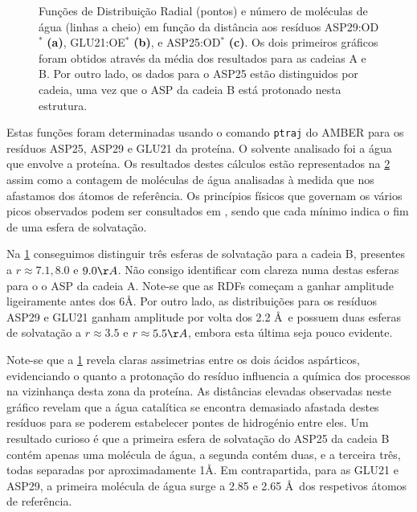 \documentclass[12pt,a4paper]{article}
\begin{document}
\begin{figure}[h]
\begin{subfigure}[b]{0.6\textwidth}
			\caption{}
			\label{fig:an:rdf-asp25}
		\end{subfigure}
		\caption{Funções de Distribuição Radial (pontos) e número de moléculas de água (linhas a cheio) em função da distância aos resíduos ASP29:OD$^{*}$ \textbf{(a)}, GLU21:OE$^{*}$ \textbf{(b)}, e ASP25:OD$^{*}$ \textbf{(c)}. Os dois primeiros gráficos foram obtidos através da média dos resultados para as cadeias A e B. Por outro lado, os dados para o ASP25 estão distinguidos por cadeia, uma vez que o ASP da cadeia B está protonado nesta estrutura.}
		\label{fig:an:rdf-all}
	\end{figure}

	Estas funções foram determinadas usando o comando \verb|ptraj| do AMBER para os resíduos ASP25, ASP29 e GLU21 da proteína. O solvente analisado foi a água que envolve a proteína. Os resultados destes cálculos estão representados na \cref{fig:an:rdf-all} assim como a contagem de moléculas de água analisadas à medida que nos afastamos dos átomos de referência. Os princípios físicos que governam os vários picos observados podem ser consultados em \cite{boydElectronDensityPartitioning1977,politzerSeparationCoreValence1976}, sendo que cada mínimo indica o fim de uma esfera de solvatação.
	
	Na \cref{fig:an:rdf-asp25} conseguimos distinguir três esferas de solvatação para a cadeia B, presentes a $r\approx 7.1, 8.0$ e $9.0\AA$. Não consigo identificar com clareza numa destas esferas para o o ASP da cadeia A. Note-se que as RDFs começam a ganhar amplitude ligeiramente antes dos 6\AA. Por outro lado, as distribuições para os resíduos ASP29 e GLU21 ganham amplitude por volta dos 2.2 \AA\ e possuem duas esferas de solvatação a $r\approx 3.5$ e $r \approx5.5 \AA$, embora esta última seja pouco evidente.
	
	Note-se que a \cref{fig:an:rdf-asp25} revela claras assimetrias entre os dois ácidos aspárticos, evidenciando o quanto a protonação do resíduo influencia a química dos processos na vizinhança desta zona da proteína. As distâncias elevadas observadas neste gráfico revelam que a água catalítica se encontra demasiado afastada destes resíduos para se poderem estabelecer pontes de hidrogénio entre eles. Um resultado curioso é que a primeira esfera de solvatação do ASP25 da cadeia B contém apenas uma molécula de água, a segunda contém duas, e a terceira três, todas separadas por aproximadamente 1\AA. Em contrapartida, para as GLU21 e ASP29, a primeira molécula de água surge a 2.85 e 2.65 \AA\ dos respetivos átomos de referência.
	
\end{document}
